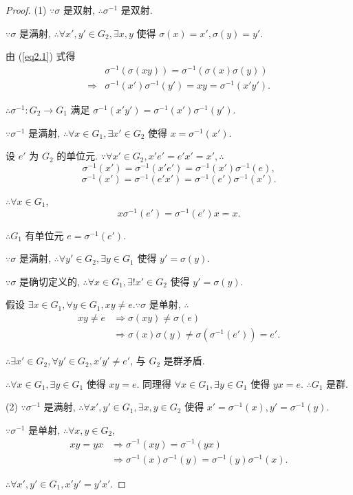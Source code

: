 \documentclass{ctexart}
\begin{document}
\begin{proof}
    (1) $\because\sigma$ 是双射, $\therefore\sigma^{-1}$ 是双射.

    $\because\sigma$ 是满射, $\therefore\forall x',y'\in G_2,\exists x,y$ 使得 $\sigma(x)=x',\sigma(y)=y'$.

    由 (\ref{eq2.1}) 式得
    \begin{align*}
        & \sigma^{-1}(\sigma(xy))=\sigma^{-1}(\sigma(x)\sigma(y)) \\
        \Rightarrow & \sigma^{-1}(x')\sigma^{-1}(y')=xy=\sigma^{-1}(x'y').
    \end{align*}

    $\therefore\sigma^{-1}:G_2\to G_1$ 满足 $\sigma^{-1}(x'y')=\sigma^{-1}(x')\sigma^{-1}(y')$.

    $\because\sigma^{-1}$ 是满射, $\therefore\forall x\in G_1,\exists x'\in G_2$ 使得 $x=\sigma^{-1}(x')$.

    设 $e'$ 为 $G_2$ 的单位元. $\because\forall x'\in G_2,x'e'=e'x'=x',\therefore$
    \[\sigma^{-1}(x')=\sigma^{-1}(x'e')=\sigma^{-1}(x')\sigma^{-1}(e),\]
    \[\sigma^{-1}(x')=\sigma^{-1}(e'x')=\sigma^{-1}(e')\sigma^{-1}(x').\]

    $\therefore\forall x\in G_1$,
    \[x\sigma^{-1}(e')=\sigma^{-1}(e')x=x.\]

    $\therefore G_1$ 有单位元 $e=\sigma^{-1}(e')$.

    $\because\sigma$ 是满射, $\therefore\forall y'\in G_2,\exists y\in G_1$ 使得 $y'=\sigma(y)$.

    $\because\sigma$ 是确切定义的, $\therefore\forall x\in G_1,\exists!x'\in G_2$ 使得 $y'=\sigma(y)$.

    假设 $\exists x\in G_1,\forall y\in G_1,xy\neq e.\because\sigma$ 是单射, $\therefore$
    \begin{align*}
        xy\neq e & \Rightarrow\sigma(xy)\neq\sigma(e) \\
        & \Rightarrow\sigma(x)\sigma(y)\neq\sigma(\sigma^{-1}(e'))=e'.
    \end{align*}

    $\therefore\exists x'\in G_2,\forall y'\in G_2,x'y'\neq e'$, 与 $G_2$ 是群矛盾.

    $\therefore\forall x\in G_1,\exists y\in G_1$ 使得 $xy=e$. 同理得 $\forall x\in G_1,\exists y\in G_1$ 使得 $yx=e$. $\therefore G_1$ 是群.

    (2) $\because\sigma^{-1}$ 是满射, $\therefore\forall x',y'\in G_1,\exists x,y\in G_2$ 使得 $x'=\sigma^{-1}(x),y'=\sigma^{-1}(y)$.

    $\because\sigma^{-1}$ 是单射, $\therefore\forall x,y\in G_2$,
    \begin{align*}
        xy=yx & \Rightarrow\sigma^{-1}(xy)=\sigma^{-1}(yx) \\
        & \Rightarrow\sigma^{-1}(x)\sigma^{-1}(y)=\sigma^{-1}(y)\sigma^{-1}(x).
    \end{align*}

    $\therefore\forall x',y'\in G_1,x'y'=y'x'$.
\end{proof}
\end{document}
